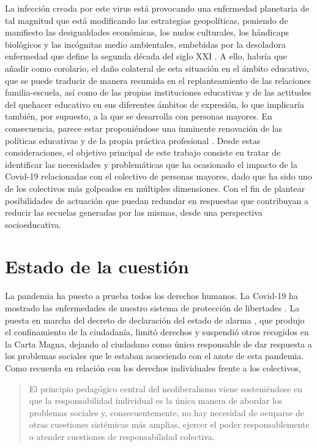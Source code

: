 \documentclass[spanish]{textolivre}
\begin{document}
La infección creada por este virus está provocando una enfermedad planetaria de tal magnitud que está modificando las estrategias geopolíticas, poniendo de manifiesto las desigualdades económicas, los nudos culturales, los hándicaps biológicos y las incógnitas medio ambientales, embebidas por la desoladora enfermedad que define la segunda década del siglo XXI \cite{lunanemecio2020}. %
A ello, habría que añadir como corolario, el daño colateral de esta situación en el ámbito educativo, que se puede traducir de manera resumida en el replanteamiento de las relaciones familia-escuela, así como de las propias instituciones educativas y de las actitudes del quehacer educativo en sus diferentes ámbitos de expresión, lo que implicaría también, por supuesto, a la que se desarrolla con personas mayores. En consecuencia, parece estar proponiéndose una inminente renovación de las políticas educativas y de la propia práctica profesional \cite{bolivar2020}. %
Desde estas consideraciones, el objetivo principal  de este trabajo consiste en tratar de identificar las necesidades y problemáticas que ha ocasionado el impacto de la Covid-19 relacionadas con el colectivo de personas mayores, dado que ha sido uno de los colectivos más golpeados en múltiples dimensiones. Con el fin de plantear posibilidades de actuación que puedan redundar en respuestas que contribuyan a reducir las secuelas generadas por las mismas, desde una perspectiva socioeducativa.

\section{Estado de la cuestión}
La pandemia ha puesto a prueba todos los derechos humanos. La Covid-19 ha mostrado las enfermedades de nuestro sistema de protección de libertades \cite{montalvo2020}. %
La puesta en marcha del decreto de declaración del estado de alarma \cite{realdecreto}, %
que produjo el confinamiento de la ciudadanía, limitó derechos y suspendió otros recogidos en la Carta Magna, dejando al ciudadano como único responsable de dar respuesta a los problemas sociales que le estaban acaeciendo con el azote de esta pandemia. Como recuerda \textcite[p. 1]{giroux2020} %
en relación con los derechos individuales frente a los colectivos,

\begin{quote}
    El principio pedagógico central del neoliberalismo viene sosteniéndose en que la responsabilidad individual es la única manera de abordar los problemas sociales y, consecuentemente, no hay necesidad de ocuparse de otras cuestiones sistémicas más amplias, ejercer el poder responsablemente o atender cuestiones de responsabilidad colectiva.
\end{quote}
\end{document}
